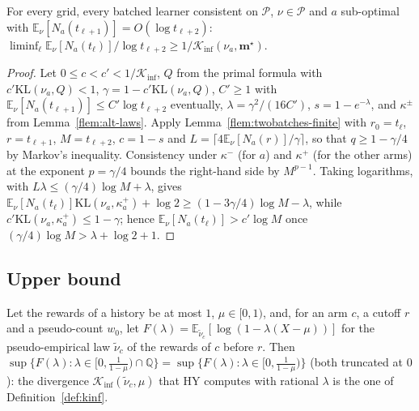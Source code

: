 \documentclass[11pt]{article}
\newcommand{\E}{\mathbb{E}}
\newcommand{\KL}{\mathrm{KL}}
\newcommand{\Kinf}{\mathcal K_{\inf}}
\newcommand{\cP}{\mathcal P}
\begin{document}
\begin{lemma}\label{flem:twobatches}
For every grid, every batched learner consistent on $\cP$, $\nu\in\cP$ and $a$ sub-optimal with
$\E_\nu[N_a(t_{\ell+1})]=O(\log t_{\ell+2})$:
$\liminf_\ell\E_\nu[N_a(t_\ell)]/\log t_{\ell+2}\ge1/\Kinf(\nu_a,\mathbf m^\star)$.
\end{lemma}

\begin{proof}
Let $0\le c<c'<1/\Kinf$, $Q$ from the primal formula with $c'\KL(\nu_a,Q)<1$,
$\gamma=1-c'\KL(\nu_a,Q)$, $C'\ge1$ with $\E_\nu[N_a(t_{\ell+1})]\le C'\log t_{\ell+2}$ eventually,
$\lambda=\gamma^2/(16C')$, $s=1-e^{-\lambda}$, and $\kappa^\pm$ from Lemma~\ref{flem:alt-laws}. Apply
Lemma~\ref{flem:twobatches-finite} with $r_0=t_\ell$, $r=t_{\ell+1}$, $M=t_{\ell+2}$, $c=1-s$ and
$L=\lceil4\E_\nu[N_a(r)]/\gamma\rceil$, so that $q\ge1-\gamma/4$ by Markov's inequality. Consistency
under $\kappa^-$ (for $a$) and $\kappa^+$ (for the other arms) at the exponent $p=\gamma/4$ bounds
the right-hand side by $M^{p-1}$. Taking logarithms, with $L\lambda\le(\gamma/4)\log M+\lambda$,
gives $\E_\nu[N_a(t_\ell)]\KL(\nu_a,\kappa^+_a)+\log2\ge(1-3\gamma/4)\log M-\lambda$, while
$c'\KL(\nu_a,\kappa^+_a)\le1-\gamma$; hence $\E_\nu[N_a(t_\ell)]>c'\log M$ once
$(\gamma/4)\log M>\lambda+\log2+1$.
\end{proof}

\subsection{Upper bound}

\begin{lemma}\label{flem:rational-sup}
Let the rewards of a history be at most $1$, $\mu\in[0,1)$, and, for an arm $c$, a cutoff $r$ and a
pseudo-count $w_0$, let $F(\lambda)=\E_{\tilde\nu_c}[\log(1-\lambda(X-\mu))]$ for the
pseudo-empirical law $\tilde\nu_c$ of the rewards of $c$ before $r$. Then
$\sup\{F(\lambda):\lambda\in[0,\frac1{1-\mu})\cap\mathbb Q\}=\sup\{F(\lambda):\lambda\in[0,\frac1{1-\mu})\}$
(both truncated at $0$): the divergence $\Kinf(\tilde\nu_c,\mu)$ that HY computes with rational
$\lambda$ is the one of Definition~\ref{def:kinf}.
\end{lemma}
\end{document}
